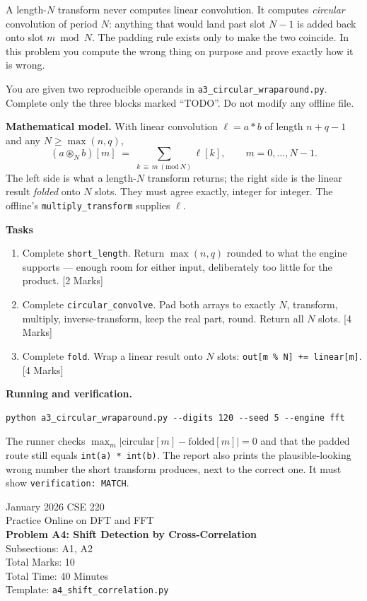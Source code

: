 \documentclass[11pt]{article}
\newcommand{\file}[1]{\texttt{#1}}
\newcommand{\code}[1]{\texttt{#1}}
\newcommand{\problemheader}[3]{%
  \begin{center}
    {\large January 2026 CSE 220}\\
    {\large Practice Online on DFT and FFT}\\[2pt]
    {\Large\bfseries #1}\\[2pt]
    Subsections: #2\\
    Total Marks: 10\\
    Total Time: 40 Minutes\\[2pt]
    {\small Template: \file{#3}}
  \end{center}
  \vspace{4pt}
}
\begin{document}
A length-$N$ transform never computes linear convolution. It computes
\emph{circular} convolution of period $N$: anything that would land past slot
$N-1$ is added back onto slot $m \bmod N$. The padding rule exists only to make
the two coincide. In this problem you compute the wrong thing on purpose and
prove exactly how it is wrong.

You are given two reproducible operands in \file{a3\_circular\_wraparound.py}.
Complete only the three blocks marked ``TODO''. Do not modify any offline file.

\textbf{Mathematical model.} With linear convolution $\ell = a * b$ of length
$n + q - 1$ and any $N \ge \max(n, q)$,
\[
  (a \circledast_N b)[m] \;=\; \sum_{k \,\equiv\, m \ (\mathrm{mod}\ N)} \ell[k],
  \qquad m = 0, \dots, N-1 .
\]
The left side is what a length-$N$ transform returns; the right side is the
linear result \emph{folded} onto $N$ slots. They must agree exactly, integer
for integer. The offline's \code{multiply\_transform} supplies $\ell$.

\textbf{Tasks}
\begin{enumerate}[nosep]
  \item Complete \code{short\_length}. Return $\max(n, q)$ rounded to what the
        engine supports --- enough room for either input, deliberately too
        little for the product.
        \hfill [2 Marks]
  \item Complete \code{circular\_convolve}. Pad both arrays to exactly $N$,
        transform, multiply, inverse-transform, keep the real part, round.
        Return all $N$ slots.
        \hfill [4 Marks]
  \item Complete \code{fold}. Wrap a linear result onto $N$ slots:
        \code{out[m \% N] += linear[m]}.
        \hfill [4 Marks]
\end{enumerate}

\textbf{Running and verification.}
\begin{lstlisting}
python a3_circular_wraparound.py --digits 120 --seed 5 --engine fft
\end{lstlisting}
The runner checks $\max_m |\text{circular}[m] - \text{folded}[m]| = 0$ and that
the padded route still equals \code{int(a) * int(b)}. The report also prints
the plausible-looking wrong number the short transform produces, next to the
correct one. It must show \code{verification: MATCH}.

\newpage
\problemheader{Problem A4: Shift Detection by Cross-Correlation}{A1, A2}{a4\_shift\_correlation.py}
\end{document}
